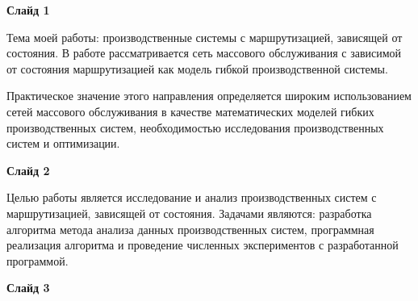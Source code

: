 \documentclass[a4paper,14pt]{extarticle}
\theoremstyle{note}
\begin{document}
\textbf{Слайд 1}

Тема моей работы: производственные системы с маршрутизацией, зависящей от состояния. В работе рассматривается сеть массового обслуживания с зависимой от состояния маршрутизацией как модель гибкой производственной системы.

Практическое значение этого направления определяется широким использованием сетей массового обслуживания в качестве математических моделей гибких производственных систем, необходимостью исследования производственных систем и оптимизации.

\textbf{Слайд 2}

Целью работы является исследование и анализ производственных систем с маршрутизацией, зависящей от состояния. Задачами являются: разработка алгоритма метода анализа данных производственных систем, программная реализация алгоритма и проведение численных экспериментов с разработанной программой.


\textbf{Слайд 3}
\end{document}
